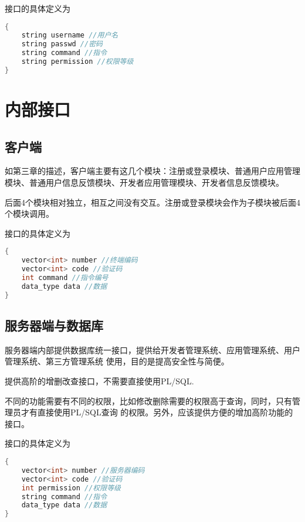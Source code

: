 {\color{red}
	接口的具体定义为
	
\begin{lstlisting}[language=C, caption=安装/卸载接口, label={code:first-code}]
{
	string username //用户名
	string passwd //密码
	string command //指令
	string permission //权限等级
}
\end{lstlisting}
}

\section{内部接口}

\subsection{客户端}
如第三章的描述，客户端主要有这几个模块：注册或登录模块、普通用户应用管理模块、普通用户信息反馈模块、开发者应用管理模块、开发者信息反馈模块。

后面4个模块相对独立，相互之间没有交互。注册或登录模块会作为子模块被后面4个模块调用。


{\color{red}
	接口的具体定义为
	
\begin{lstlisting}[language=C, caption=安装/卸载接口, label={code:first-code}]
{
	vector<int> number //终端编码
	vector<int> code //验证码
	int command //指令编号
	data_type data //数据
}
\end{lstlisting}
}

\subsection{服务器端与数据库}
服务器端内部提供数据库统一接口，提供给开发者管理系统、应用管理系统、用户管理系统、第三方管理系统
使用，目的是提高安全性与简便。

提供高阶的增删改查接口，不需要直接使用PL/SQL.

不同的功能需要有不同的权限，比如修改删除需要的权限高于查询，同时，只有管理员才有直接使用PL/SQL查询
的权限。另外，应该提供方便的增加高阶功能的接口。


{\color{red}
	接口的具体定义为
	
\begin{lstlisting}[language=C, caption=安装/卸载接口, label={code:first-code}]
{
	vector<int> number //服务器编码
	vector<int> code //验证码
	int permission //权限等级
	string command //指令
	data_type data //数据
}
\end{lstlisting}
}
